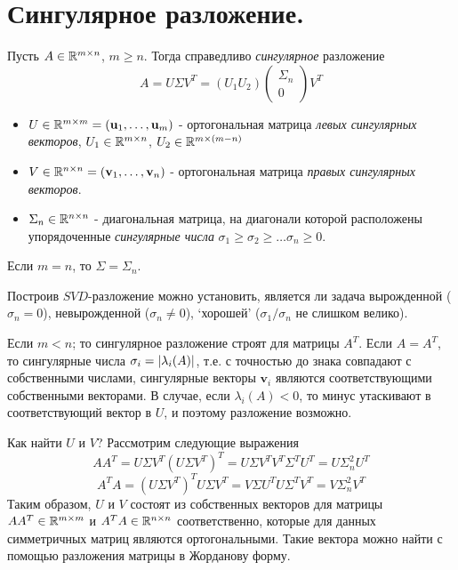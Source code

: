 \section{Сингулярное разложение.}

\begin{statement}
  Пусть $A\in\mathbb{R}^{m\times n}$, $m\geq n$. Тогда справедливо \textit{сингулярное} разложение
  \[A=U\Sigma V^T=(U_1U_2)\left(\begin{array}{c}
        \Sigma_n \\ 0
      \end{array}\right)V^T\]
  \begin{itemize}
    \item $U\in\mathbb{R}^{m\times m}=(\mathbf{u}_1,\ldots,\mathbf{u}_m)$ - ортогональная матрица \textit{левых сингулярных векторов}, $U_1\in\mathbb{R}^{m\times n}$, $U_2\in\mathbb{R}^{m\times (m-n)}$
    \item $V\in\mathbb{R}^{n\times n}=(\mathbf{v}_1,\ldots,\mathbf{v}_n)$ - ортогональная матрица \textit{правых сингулярных векторов}.
    \item $\Sigma_n\in\mathbb{R}^{n\times n}$ - диагональная матрица,
          на диагонали которой расположены упорядоченные \textit{сингулярные числа} $\sigma_1\geq\sigma_2\geq\ldots\sigma_n\geq0$.
  \end{itemize}
\end{statement}

Если $m = n$, то $\Sigma=\Sigma_n$.

Построив $SVD$-разложение можно установить, является ли задача вырожденной
($\sigma_n=0$), невырожденной ($\sigma_n\neq0$), `хорошей' ($\sigma_1/\sigma_n$ не слишком велико).

Если $m<n$; то сингулярное разложение строят для матрицы $A^T$.
Если $A=A^T$, то сингулярные числа $\sigma_{i}=\left\lvert\lambda_i(A)\right\rvert$,
т.е. с точностью до знака совпадают с собственными числами,
сингулярные векторы $\mathbf{v}_i$ являются соответствующими собственными векторами.
В случае, если $\lambda_i(A)<0$, то минус утаскивают в соответствующий
вектор в $U$, и поэтому разложение возможно.

Как найти $U$ и $V$? Рассмотрим следующие выражения
\[AA^T=U\Sigma V^T(U\Sigma V^T)^T=U\Sigma V^TV^T\Sigma^T U^T=U\Sigma_n^2U^T\]
\[A^TA=(U\Sigma V^T)^TU\Sigma V^T=V\Sigma U^TU\Sigma^T V^T=V\Sigma_n^2V^T\]
Таким образом, $U$ и $V$ состоят из собственных
векторов для матрицы $AA^T\in\mathbb{R}^{m\times m}$ и $A^TA\in\mathbb{R}^{n\times n}$ соответственно,
которые для данных симметричных матриц являются ортогональными.
Такие вектора можно найти с помощью разложения матрицы в Жорданову форму.


